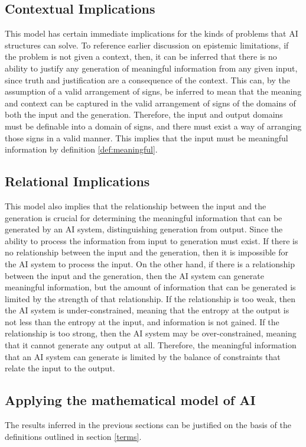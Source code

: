 \documentclass[stu,12pt]{apa7}
\theoremstyle{definition}
\begin{document}
\subsection{Contextual Implications}
This model has certain immediate implications for the kinds of problems that AI structures can solve. To reference earlier discussion on epistemic limitations, if the problem is not given a context, then, it can be inferred that there is no ability to justify any generation of meaningful information from any given input, since truth and justification are a consequence of the context. This can, by the assumption of a valid arrangement of signs, be inferred to mean that the meaning and context can be captured in the valid arrangement of signs of the domains of both the input and the generation. Therefore, the input and output domains must be definable into a domain of signs, and there must exist a way of arranging those signs in a valid manner. This implies that the input must be meaningful information by definition \ref{def:meaningful}.

\subsection{Relational Implications}
This model also implies that the relationship between the input and the generation is crucial for determining the meaningful information that can be generated by an AI system, distinguishing generation from output. Since the ability to process the information from input to generation must exist. If there is no relationship between the input and the generation, then it is impossible for the AI system to process the input. On the other hand, if there is a relationship between the input and the generation, then the AI system can generate meaningful information, but the amount of information that can be generated is limited by the strength of that relationship. If the relationship is too weak, then the AI system is under-constrained, meaning that the entropy at the output is not less than the entropy at the input, and information is not gained. If the relationship is too strong, then the AI system may be over-constrained, meaning that it cannot generate any output at all. Therefore, the meaningful information that an AI system can generate is limited by the balance of constraints that relate the input to the output.

\subsection{Applying the mathematical model of AI}
The results inferred in the previous sections can be justified on the basis of the definitions outlined in section \ref{terms}. 
\end{document}
